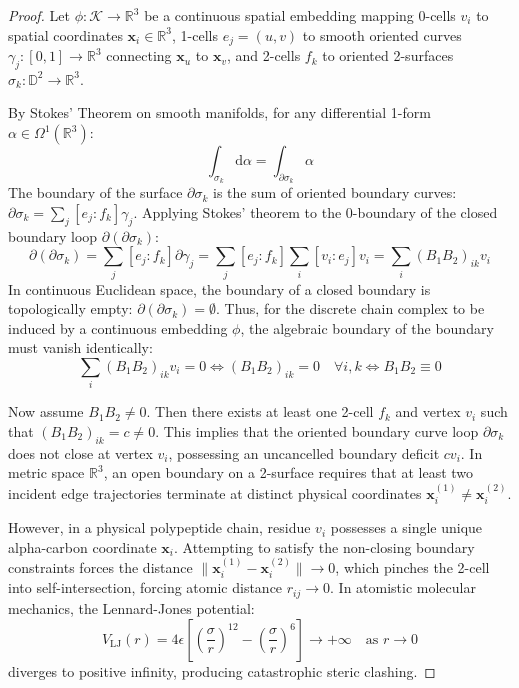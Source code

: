 \begin{proof}
Let $\phi : \mathcal{K} \to \mathbb{R}^3$ be a continuous spatial embedding mapping 0-cells $v_i$ to spatial coordinates $\mathbf{x}_i \in \mathbb{R}^3$, 1-cells $e_j = (u, v)$ to smooth oriented curves $\gamma_j : [0, 1] \to \mathbb{R}^3$ connecting $\mathbf{x}_u$ to $\mathbf{x}_v$, and 2-cells $f_k$ to oriented 2-surfaces $\sigma_k : \mathbb{D}^2 \to \mathbb{R}^3$.

By Stokes' Theorem on smooth manifolds, for any differential 1-form $\alpha \in \Omega^1(\mathbb{R}^3)$:
\begin{equation}
    \int_{\sigma_k} \mathrm{d}\alpha = \int_{\partial \sigma_k} \alpha
\end{equation}
The boundary of the surface $\partial \sigma_k$ is the sum of oriented boundary curves: $\partial \sigma_k = \sum_{j} [e_j : f_k] \gamma_j$. Applying Stokes' theorem to the 0-boundary of the closed boundary loop $\partial(\partial \sigma_k)$:
\begin{equation}
    \partial(\partial \sigma_k) = \sum_{j} [e_j : f_k] \partial \gamma_j = \sum_{j} [e_j : f_k] \sum_i [v_i : e_j] v_i = \sum_i (B_1 B_2)_{ik} v_i
\end{equation}
In continuous Euclidean space, the boundary of a closed boundary is topologically empty: $\partial(\partial \sigma_k) = \emptyset$. Thus, for the discrete chain complex to be induced by a continuous embedding $\phi$, the algebraic boundary of the boundary must vanish identically:
\begin{equation}
    \sum_i (B_1 B_2)_{ik} v_i = 0 \iff (B_1 B_2)_{ik} = 0 \quad \forall i, k \iff B_1 B_2 \equiv 0
\end{equation}

Now assume $B_1 B_2 \ne 0$. Then there exists at least one 2-cell $f_k$ and vertex $v_i$ such that $(B_1 B_2)_{ik} = c \ne 0$. This implies that the oriented boundary curve loop $\partial \sigma_k$ does not close at vertex $v_i$, possessing an uncancelled boundary deficit $c v_i$. In metric space $\mathbb{R}^3$, an open boundary on a 2-surface requires that at least two incident edge trajectories terminate at distinct physical coordinates $\mathbf{x}_i^{(1)} \ne \mathbf{x}_i^{(2)}$. 

However, in a physical polypeptide chain, residue $v_i$ possesses a single unique alpha-carbon coordinate $\mathbf{x}_i$. Attempting to satisfy the non-closing boundary constraints forces the distance $\|\mathbf{x}_i^{(1)} - \mathbf{x}_i^{(2)}\| \to 0$, which pinches the 2-cell into self-intersection, forcing atomic distance $r_{ij} \to 0$. In atomistic molecular mechanics, the Lennard-Jones potential:
\begin{equation}
    V_{\text{LJ}}(r) = 4\epsilon \left[ \left(\frac{\sigma}{r}\right)^{12} - \left(\frac{\sigma}{r}\right)^6 \right] \longrightarrow +\infty \quad \text{as } r \to 0
\end{equation}
diverges to positive infinity, producing catastrophic steric clashing. 


\end{proof}
